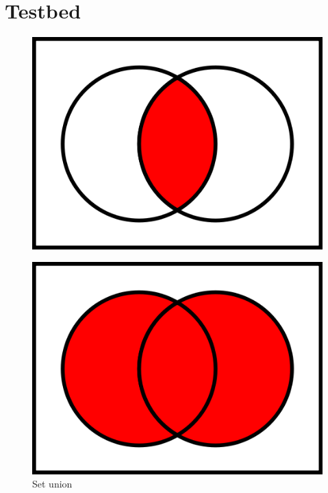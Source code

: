 \documentclass[12pt]{article}
\theoremstyle{plain}
\theoremstyle{definition}
\theoremstyle{remark}
\theoremstyle{mystyle}
\begin{document}

\cleardoublepage
\newpage

\section{Testbed}
\begin{figure}[ht]
\centering
\includegraphics[scale=0.25]{AcapB}
\end{figure}

\begin{figure}[ht]
\centering
\includegraphics[scale=0.25]{AcupB}
\caption{Set union\label{fig:acupb}}
\end{figure}
\end{document}
